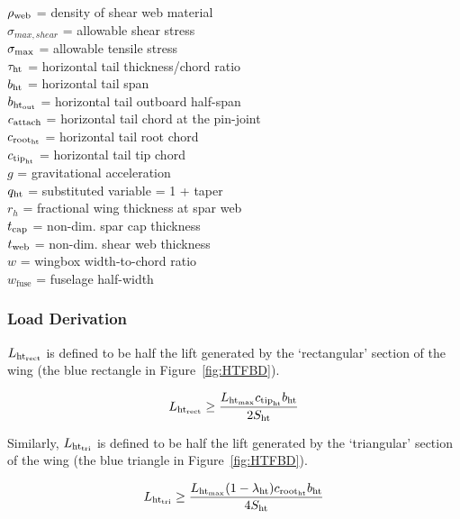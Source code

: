 \begin{tabbing}
$\rho_{\rm{web}}$ = density of shear web material \\
$\sigma_{max,shear}$ = allowable shear stress \\
$\sigma_{\rm{max}}$ = allowable tensile stress \\
$\tau_{\rm{ht}}$ = horizontal tail thickness/chord ratio \\
$b_{\rm{ht}}$ = horizontal tail span \\
$b_{\rm{ht}_{\rm{out}}}$ = horizontal tail outboard half-span\\
$c_{\rm{attach}}$ = horizontal tail chord at the pin-joint \\
$c_{\rm{root}_{\rm{ht}}}$ = horizontal tail root chord \\
$c_{\rm{tip}_{\rm{ht}}}$ = horizontal tail tip chord \\
$g$ = gravitational acceleration \\
$q_{\rm{ht}}$ = substituted variable = 1 + taper \\
$r_h$ = fractional wing thickness at spar web \\
$t_{\rm{cap}}$ = non-dim. spar cap thickness \\
$t_{\rm{web}}$ = non-dim. shear web thickness \\
$w$ = wingbox width-to-chord ratio \\
$w_{\textrm{fuse}}$ = fuselage half-width \\
\end{tabbing}

\subsubsection{Load Derivation}

$L_{\rm{ht}_{rect}}$ is defined to be half the lift generated by the `rectangular' 
section of the wing (the blue rectangle in Figure~\ref{fig:HTFBD}).

\begin{equation}
    L_{\rm{ht}_{rect}} \geq \frac{L_{\rm{ht}_{\rm{max}}} c_{\rm{tip}_{\rm{ht}}} b_{\rm{ht}}}{2 S_{\rm{ht}}}
\end{equation}

Similarly, $L_{\rm{ht}_{\rm{tri}}}$ is defined to be half the lift generated by the 
`triangular' section of the wing (the blue triangle in Figure~\ref{fig:HTFBD}).
 
\begin{equation}
     L_{\rm{ht}_{\rm{\rm{tri}}}} \geq \frac{L_{\rm{ht}_{\rm{max}}} (1 - \lambda_{\rm{ht}}) c_{\rm{root}_{\rm{ht}}} b_{\rm{ht}}}{4 
S_{\rm{ht}}}
\end{equation}
 

